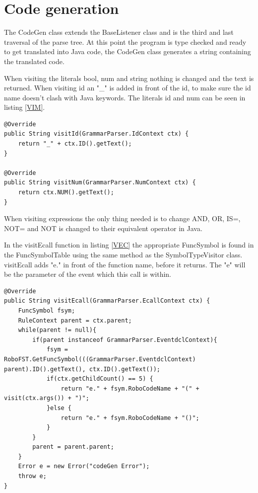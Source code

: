 \section{Code generation}
The CodeGen class extends the BaseListener class and is the third and last traversal of the parse tree. At this point the program is type checked and ready to get translated into Java code, the CodeGen class generates a string containing the translated code. 

When visiting the literals bool, num and string nothing is changed and the text is returned. When visiting id an "\_" is added in front of the id, to make sure the id name doesn't clash with Java keywords. The literals id and num can be seen in listing \ref{VIM}. 

\begin{lstlisting}[caption={CodeGen - visitId \& visitNum functions}, label={VIM}]
@Override
public String visitId(GrammarParser.IdContext ctx) {
    return "_" + ctx.ID().getText();
}

@Override
public String visitNum(GrammarParser.NumContext ctx) {
    return ctx.NUM().getText();
}
\end{lstlisting}

When visiting expressions the only thing needed is to change AND, OR, IS=, NOT= and NOT is changed to their equivalent operator in Java. 

In the visitEcall function in listing \ref{VEC} the appropriate FuncSymbol is found in the FuncSymbolTable using the same method as the SymbolTypeVisitor class. visitEcall adds "e." in front of the function name, before it returns. The "e" will be the parameter of the event which this call is within. 

\begin{lstlisting}[caption={CodeGen - visitEcall function}, label={VEC}]
@Override
public String visitEcall(GrammarParser.EcallContext ctx) {
    FuncSymbol fsym;
    RuleContext parent = ctx.parent;
    while(parent != null){
        if(parent instanceof GrammarParser.EventdclContext){
            fsym = RoboFST.GetFuncSymbol(((GrammarParser.EventdclContext) parent).ID().getText(), ctx.ID().getText());
            if(ctx.getChildCount() == 5) {
                return "e." + fsym.RoboCodeName + "(" + visit(ctx.args()) + ")";
            }else {
                return "e." + fsym.RoboCodeName + "()";
            }
        }
        parent = parent.parent;
    }
    Error e = new Error("codeGen Error");
    throw e;
}
\end{lstlisting}

